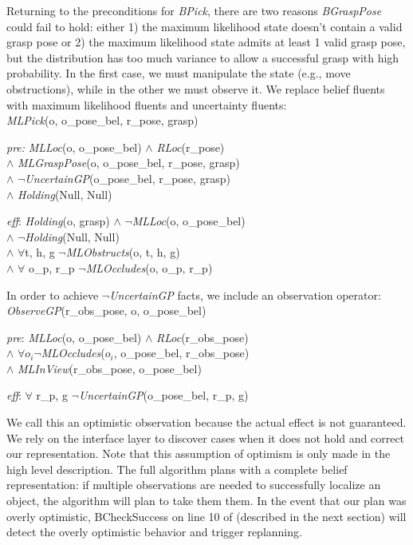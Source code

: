 Returning to the preconditions for \emph{BPick}, there are
two reasons \emph{BGraspPose} could fail to hold: either 1) the
maximum likelihood state doesn't contain a valid grasp pose or 2) the
maximum likelihood state admits at least 1 valid grasp pose, but the
distribution has too much variance to allow a successful grasp with
high probability. In the first case, we must manipulate the state
(e.g., move obstructions), while in the other we must observe it. We
replace belief fluents with maximum likelihood fluents and uncertainty
fluents:\\ \emph{MLPick}(o, o\_pose\_bel, r\_pose, grasp)
\begin{tightlist}
\item[\emph{pre:}] \emph{MLLoc}(o, o\_pose\_bel) $\wedge$
  \emph{RLoc}(r\_pose) \\$\wedge$ \emph{MLGraspPose}(o,
  o\_pose\_bel, r\_pose, grasp) \\$\wedge$
  $\lnot$\emph{UncertainGP}(o\_pose\_bel, r\_pose, grasp)\\$\wedge$
  \emph{Holding}(Null, Null)
\item[\emph{eff}:] \emph{Holding}(o, grasp) $\wedge$
  $\lnot$\emph{MLLoc}(o, o\_pose\_bel) \\$\wedge$
  $\lnot$\emph{Holding}(Null, Null) \\$\wedge$ $\forall$t, h, g
  $\lnot$\emph{MLObstructs}(o, t, h, g)\\ $\wedge$ $\forall$ o\_p,
  r\_p $\lnot$\emph{MLOccludes}(o, o\_p, r\_p)
\end{tightlist}
In order to achieve $\lnot$\emph{UncertainGP} facts, we include an
observation operator:\\
\emph{ObserveGP}(r\_obs\_pose, o, o\_pose\_bel)
\begin{tightlist}
  \item[\emph{pre}:] \emph{MLLoc}(o, o\_pose\_bel) $\wedge$
    \emph{RLoc}(r\_obs\_pose) \\$\wedge$ $\forall o_i
    \lnot$\emph{MLOccludes}($o_i$, o\_pose\_bel, r\_obs\_pose) \\ $\wedge$
    \emph{MLInView}(r\_obs\_pose, o\_pose\_bel)
  \item[\emph{eff}:] $\forall$ r\_p, g $\lnot$\emph{UncertainGP}(o\_pose\_bel, r\_p, g)
\end{tightlist}
We call this an optimistic observation because the actual effect is
not guaranteed. We rely on the interface layer to discover cases when
it does not hold and correct our representation. Note that this
assumption of optimism is only made in the high level description. The
full algorithm plans with a complete belief representation: if
multiple observations are needed to successfully localize an object,
the algorithm will plan to take them them. In the event that our plan
was overly optimistic, BCheckSuccess on line 10 of 
(described in the next section) will detect the overly optimistic
behavior and trigger replanning.

